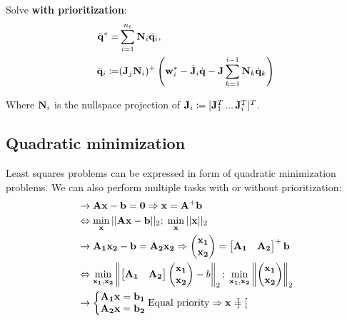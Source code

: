 \documentclass[a4paper, 8pt]{extarticle}
\begin{document}
\begin{multicols*}{3}
Solve \textbf{with prioritization}:
\begin{align*}
\ddot{\bf q}^* =& \sum_{i=1}^{n_t}{\bf N}_i\ddot{\bf q}_i, \\
\ddot{\bf q}_i  \coloneqq&  ({\bf J}_j{\bf N}_i)^+ \left( {\bf w}_i^* - \dot{\bf J}_i\dot{\bf q} - {\bf J}\sum_{k = 1}^{i-1}{\bf N}_k\dot{\bf q}_k \right)
\end{align*}

Where ${\bf N}_i$ is the nullspace projection of ${\bf J}_i \coloneqq [{\bf J}_1^T \, ... \, {\bf J}_i^T]^T$.




\subsection*{Quadratic minimization}
Least squares problems can be expressed in form of quadratic minimization problems. We can also perform multiple tasks with or without prioritization:
\begin{align*}
& \rightarrow \mathbf{Ax - b = 0} \Rightarrow \mathbf{x = A^+b} \\
&\Leftrightarrow \min_{\bf x}||\mathbf{Ax - b}||_2; \; \min_{\bf x}||{\bf x}||_2 \\
& \rightarrow \mathbf{A_1x_2 - b = A_2x_2} \Rightarrow \mathbf{\begin{pmatrix}
\bf x_1\\ \bf x_2
\end{pmatrix} = \begin{bmatrix}
\bf A_1 & \bf A_2
\end{bmatrix}^+b} \\
&\Leftrightarrow \min_{\bf x_1,x_2}\left\lVert\begin{bmatrix}
\bf A_1 & \bf A_2
\end{bmatrix}\begin{pmatrix}
\bf x_1\\ \bf x_2
\end{pmatrix} - b\right\rVert_2; \; \min_{\bf x_1,x_2}\left\lVert\begin{pmatrix}
\bf x_1\\ \bf x_2
\end{pmatrix}\right\rVert_2 \\
& \rightarrow \left\{ \begin{matrix}
\mathbf{A_1x = b_1}\\
\mathbf{A_2x = b_2}
\end{matrix}\right. \text{Equal priority} \Rightarrow {\bf x} = \begin{bmatrix}

\end{bmatrix}
\end{align*}
\end{multicols*}
\end{document}
